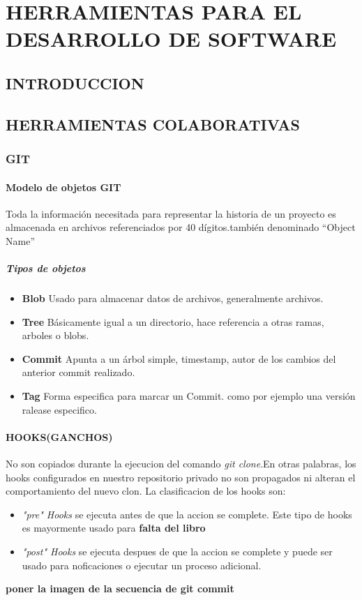 

%
\chapter{HERRAMIENTAS PARA EL DESARROLLO DE SOFTWARE}
\section{INTRODUCCION}
\section{HERRAMIENTAS COLABORATIVAS}
\subsection{GIT}
\subsubsection{Modelo de objetos GIT}
Toda la información necesitada para representar la historia de un proyecto es almacenada en archivos referenciados por 40 dígitos.también denominado ``Object Name''
\paragraph{Tipos de objetos}
\begin{itemize}
 \item \textbf{Blob} Usado para almacenar datos de archivos, generalmente archivos.
 \item \textbf{Tree} Básicamente igual a un directorio, hace referencia a otras ramas, arboles o blobs.
 \item \textbf{Commit} Apunta a un árbol simple, timestamp, autor de los cambios del anterior commit realizado.
 \item \textbf{Tag} Forma especifica para marcar un Commit. como por ejemplo una versión ralease especifico.
\end{itemize}

\subsubsection{HOOKS(GANCHOS)}
No son copiados durante la ejecucion del comando \textit{git clone}.En otras palabras, los hooks configurados en nuestro repositorio privado no son propagados ni alteran el 
comportamiento del nuevo clon.
La clasificacion de los hooks son:
\begin{itemize}
 \item \textit{"pre" Hooks} se ejecuta antes de que la accion se complete. Este tipo de hooks es mayormente usado para \textbf{falta del libro}
 \item \textit{"post" Hooks} se ejecuta despues de que la accion se complete y puede ser usado para noficaciones o ejecutar un proceso adicional.
\end{itemize}

\textbf{poner la imagen de la secuencia de git commit}

%
